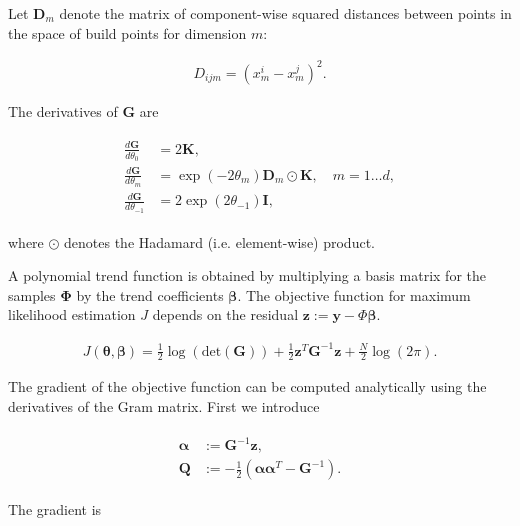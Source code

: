 \noindent Let $\boldsymbol{D}_m$ denote the matrix of component-wise squared
distances between points in the space of build points for dimension $m$:

\begin{gather}
D_{ijm}  = \left( x^i_m - x^j_m \right)^2.
\end{gather}

\noindent The derivatives of $\boldsymbol{G}$ are

\begin{gather}
\begin{aligned}
\frac{d\boldsymbol{G}}{d\theta_0} &= 2 \boldsymbol{K}, \\
\frac{d\boldsymbol{G}}{d\theta_m} &= \exp \left( -2 \theta_m \right) \boldsymbol{D}_m \odot \boldsymbol{K},  \quad  m = 1 \ldots d, \\
\frac{d\boldsymbol{G}}{d\theta_{-1}} &= 2 \exp(2 \theta_{-1}) \boldsymbol{I},
\end{aligned}
\end{gather}

\noindent where $\odot$ denotes the Hadamard (i.e. element-wise) product.


A polynomial trend function is obtained by multiplying a basis matrix for the
samples $\boldsymbol{\Phi}$ by the trend coefficients $\boldsymbol{\beta}$. 
The objective function for maximum likelihood estimation $J$ depends 
on the residual $\boldsymbol{z} := \boldsymbol{y} - \Phi \boldsymbol{\beta}$. 

\begin{gather}
J(\boldsymbol{\theta},\boldsymbol{\beta}) = \frac{1}{2} \log \left( \text{det} \left( \boldsymbol{G} \right) \right) + \frac{1}{2} \boldsymbol{z}^T \boldsymbol{G}^{-1} \boldsymbol{z} + \frac{N}{2} \log \left( 2 \pi \right).
\end{gather}

The gradient of the objective function can be computed analytically using the 
derivatives of the Gram matrix. First we introduce

\begin{gather}
\begin{aligned}
\boldsymbol{\alpha} &:= \boldsymbol{G}^{-1} \boldsymbol{z}, \\
\boldsymbol{Q} &:= -\frac{1}{2} \left( \boldsymbol{\alpha} \boldsymbol{\alpha}^T - \boldsymbol{G}^{-1} \right).
\end{aligned}
\end{gather}

\noindent The gradient is


